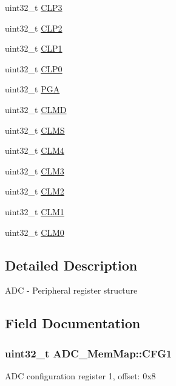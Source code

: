 \begin{DoxyCompactItemize}
\item 
uint32\+\_\+t \hyperlink{struct_a_d_c___mem_map_a6c77f6b67fa1eccf3549bcf27933f5e7}{C\+L\+P3}
\item 
uint32\+\_\+t \hyperlink{struct_a_d_c___mem_map_aac028a79faac6929bebb1b677b2fbf8b}{C\+L\+P2}
\item 
uint32\+\_\+t \hyperlink{struct_a_d_c___mem_map_ae99b44e06b93a2b62451162abe0aae92}{C\+L\+P1}
\item 
uint32\+\_\+t \hyperlink{struct_a_d_c___mem_map_a936082703bd7b18447b8edeeaa3c0c4f}{C\+L\+P0}
\item 
uint32\+\_\+t \hyperlink{struct_a_d_c___mem_map_a3c43d657acb03daee1a6abbb58206a56}{P\+G\+A}
\item 
uint32\+\_\+t \hyperlink{struct_a_d_c___mem_map_ad78aef04412250c47f943c007ad2eed2}{C\+L\+M\+D}
\item 
uint32\+\_\+t \hyperlink{struct_a_d_c___mem_map_ad4519a320afe549d5b275b534be9bc39}{C\+L\+M\+S}
\item 
uint32\+\_\+t \hyperlink{struct_a_d_c___mem_map_a7b8d8ae0f052a3824d3b34dffdf471e0}{C\+L\+M4}
\item 
uint32\+\_\+t \hyperlink{struct_a_d_c___mem_map_a326c171566746f11f9b808930253df85}{C\+L\+M3}
\item 
uint32\+\_\+t \hyperlink{struct_a_d_c___mem_map_a2794a4dac3b6ec18535eeae7c7e2d4e3}{C\+L\+M2}
\item 
uint32\+\_\+t \hyperlink{struct_a_d_c___mem_map_a6c07d3719b54b23926239b53919f36d2}{C\+L\+M1}
\item 
uint32\+\_\+t \hyperlink{struct_a_d_c___mem_map_a1b8eeb87fa8308fe93200b6e82985c25}{C\+L\+M0}
\end{DoxyCompactItemize}


\subsection{Detailed Description}
A\+D\+C -\/ Peripheral register structure 

\subsection{Field Documentation}
\hypertarget{struct_a_d_c___mem_map_a2320de82d9559e930bc71650b02993b7}{}
\subsubsection[{C\+F\+G1}]{\setlength{\rightskip}{0pt plus 5cm}uint32\+\_\+t A\+D\+C\+\_\+\+Mem\+Map\+::\+C\+F\+G1}\label{struct_a_d_c___mem_map_a2320de82d9559e930bc71650b02993b7}
A\+D\+C configuration register 1, offset\+: 0x8 \hypertarget{struct_a_d_c___mem_map_aa39dedc8da290763fa121dc4c99dc5a4}{}
